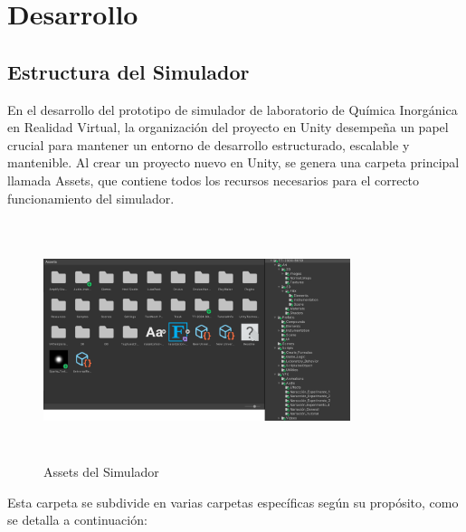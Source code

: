 \chapter{Desarrollo}\label{ch:Desarrollo}
\section{Estructura del Simulador}
En el desarrollo del prototipo de simulador de laboratorio de Química Inorgánica en Realidad Virtual, la organización del proyecto en Unity desempeña un papel crucial para mantener un entorno de desarrollo estructurado, escalable y mantenible. Al crear un proyecto nuevo en Unity, se genera una carpeta principal llamada Assets, que contiene todos los recursos necesarios para el correcto funcionamiento del simulador.

\begin{figure}[thbp]
    \centering
    \includegraphics[width=0.8\textwidth, height = 7cm]{img/chapter04/Estructura.png}
    \caption{Assets del Simulador}
    \label{fig:Assets_del_Simulador}
\end{figure}

Esta carpeta se subdivide en varias carpetas específicas según su propósito, como se detalla a continuación:

